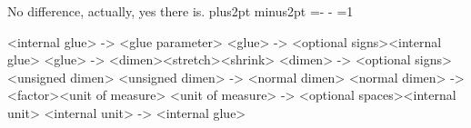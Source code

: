No difference, actually, yes there is.
\baselineskip=12pt plus2pt minus2pt
=- -\baselineskip
\showthe{}
=1\baselineskip
\showthe{}

\obeylines
<internal glue> -> <glue parameter>
<glue> -> <optional signs><internal glue>
<glue> ->  <dimen><stretch><shrink>
<dimen> -> <optional signs><unsigned dimen>
<unsigned dimen> -> <normal dimen>
<normal dimen> -> <factor><unit of measure>
<unit of measure> -> <optional spaces><internal unit>
<internal unit> -> <internal glue>
\bye 
